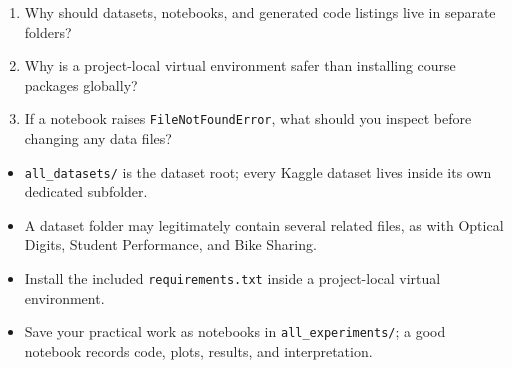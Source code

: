 \begin{quickcheck}
\begin{enumerate}
  \item Why should datasets, notebooks, and generated code listings live in separate folders?
  \item Why is a project-local virtual environment safer than installing course packages globally?
  \item If a notebook raises \texttt{FileNotFoundError}, what should you inspect before changing any data files?
\end{enumerate}
\end{quickcheck}

\begin{chapterrecap}
\begin{itemize}
  \item \texttt{all\_datasets/} is the dataset root; every Kaggle dataset lives inside its own dedicated subfolder.
  \item A dataset folder may legitimately contain several related files, as with Optical Digits, Student Performance, and Bike Sharing.
  \item Install the included \texttt{requirements.txt} inside a project-local virtual environment.
  \item Save your practical work as notebooks in \texttt{all\_experiments/}; a good notebook records code, plots, results, and interpretation.
\end{itemize}
\end{chapterrecap}
